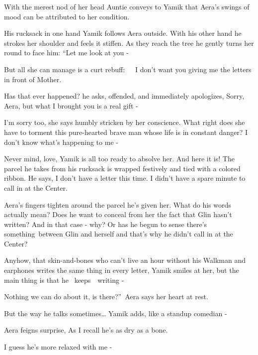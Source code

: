 \documentclass[letterpaper]{article}
\begin{document}
With the merest nod of her head Auntie conveys to Yamik that Aera's swings of mood can be attributed to her condition.

His rucksack in one hand Yamik follows Aera outside. With his other hand he strokes her shoulder and feels it stiffen.
As they reach the tree he gently turns her round to face him: ``Let me look at you -{\textquotedbl}

But all she can manage is a curt rebuff:\ \ \ {\textquotedbl}I don't want you giving me the letters in front of
Mother.{\textquotedbl} 

{\textquotedbl}Has that ever happened?{\textquotedbl} he asks, offended, and immediately apologizes,
{\textquotedbl}Sorry, Aera, but what I brought you is a real gift -{\textquotedbl} 

{\textquotedbl}I'm sorry too,{\textquotedbl} she says humbly stricken by her conscience. What right does she have to
torment this pure-hearted brave man whose life is in constant danger? {\textquotedbl}I don't know what's happening to
me -{\textquotedbl}

{\textquotedbl}Never mind, love,{\textquotedbl} Yamik is all too ready to absolve her. {\textquotedbl}And here it
is!{\textquotedbl} The parcel he takes from his rucksack is wrapped festively and tied with a colored ribbon. He says,
{\textquotedbl}I don't have a letter this time. I didn't have a spare minute to call in at the Center.{\textquotedbl} 

Aera's fingers tighten around the parcel he's given her. What do his words actually mean? Does he want to conceal from
her the fact that Glin hasn't written? And in that case - why? Or has he begun to sense there's something\ between Glin
and herself and that's why he didn't call in at the Center?

{\textquotedbl}Anyhow, that skin-and-bones who can't live an hour without his Walkman and earphones writes the same
thing in every letter,{\textquotedbl} Yamik smiles at her, {\textquotedbl}but the main thing is that he
\ keeps\ \ writing -{\textquotedbl} 

{\textquotedbl}Nothing we can do about it, is there?''~Aera says her heart at rest.

{\textquotedbl}But the way he talks sometimes{\dots}{\textquotedbl} Yamik adds, {\textquotedbl}like a standup comedian
-{\textquotedbl} 

Aera feigns surprise, {\textquotedbl}As I recall he's as dry as a bone.{\textquotedbl}

{\textquotedbl}I guess he's more relaxed with me -{\textquotedbl} 
\end{document}
